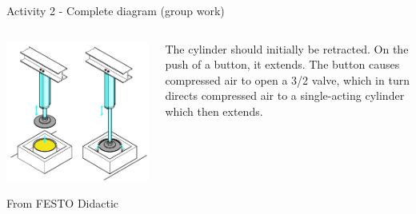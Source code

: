 \documentclass[presentation,aspectratio=1610]{beamer}
\begin{document}
\begin{frame}[label={sec:org5b0dae8}]{Activity 2 - Complete diagram  (group work)}
\begin{columns}
\begin{column}{0.3\columnwidth}
\begin{center}
\includegraphics[width=0.8\linewidth]{../../figures/cheese-stamping.png}
\end{center}
{\tiny From FESTO Didactic}
\end{column}
\begin{column}{0.7\columnwidth}
The cylinder should initially be retracted. On the push of a button, it extends. The button causes compressed air to open a 3/2 valve, which in turn directs compressed air to a single-acting cylinder which then extends.  
\end{column}
\end{columns}
\end{frame}
\end{document}
